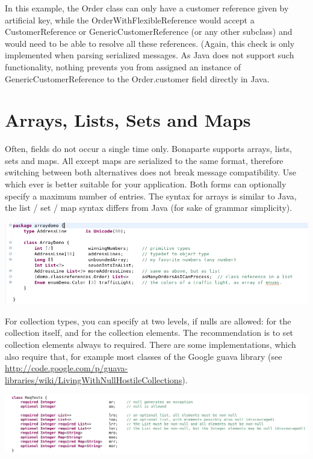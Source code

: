 \documentclass[11pt,a4paper,oneside]{article}
\begin{document}
\noindent In this example, the {\ttfamily Order} class can only have a customer reference given by artificial key, while the {\ttfamily OrderWithFlexibleReference}
would accept a {\ttfamily CustomerReference} or {\ttfamily GenericCustomerReference} (or any other subclass) and would need to be able to resolve all these
references. (Again, this check is only implemented when parsing serialized messages. As Java does not support such functionality, nothing prevents you
from assigned an instance of {\ttfamily GenericCustomerReference}  to the {\ttfamily Order.customer} field directly in Java.

\section{Arrays, Lists, Sets and Maps}
Often, fields do not occur a single time only. Bonaparte supports arrays, lists, sets and maps. All except maps are
serialized to the same format, therefore switching between both alternatives does not break message compatibility.
Use which ever is better suitable for your application.
Both forms can optionally specify a maximum number of entries. 
The syntax for arrays is similar to Java, the list / set / map syntax differs from Java (for sake of grammar simplicity).

\vspace{2mm}

\hspace{1cm}\includegraphics[scale=0.5]{images/tut1-015-arrays.png}

For collection types, you can specify at two levels, if {\ttfamily null}s are allowed: for the collection itself, and for the
collection elements.  The recommendation is to set collection elements always to {\ttfamily required}. There are some
implementations, which also require that, for example most classes of the Google {\ttfamily guava} library (see
\url{http://code.google.com/p/guava-libraries/wiki/LivingWithNullHostileCollections}).

\vspace{2mm}

\hspace{1cm}\includegraphics[scale=0.5]{images/tut1-016-collections.png}
\end{document}
